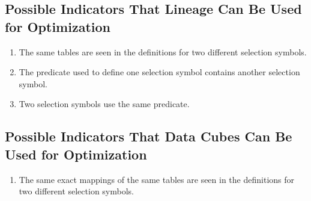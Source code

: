 \documentclass[fleqn]{sigplanconf}
\begin{document}
\subsection{Possible Indicators That Lineage Can Be Used for Optimization}
\begin{enumerate}
	\item The same tables are seen in the definitions for two different selection symbols.
	\item The predicate used to define one selection symbol contains another selection symbol.
	\item Two selection symbols use the same predicate.
\end{enumerate}
\subsection{Possible Indicators That Data Cubes Can Be Used for Optimization}
\begin{enumerate}
	\item The same exact mappings of the same tables are seen in the definitions for two different selection symbols.
\end{enumerate}



\end{document}

